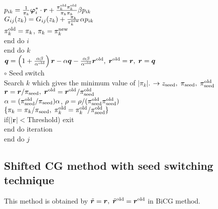 \documentclass[12pt,titlepage]{article}
\begin{document}
\\\hspace{2.0cm}
$p_{i k} = \frac{1}{\pi_k} {\boldsymbol \varphi}_i^* \cdot {\boldsymbol r} + 
\frac{\pi^{\rm old}_k \pi^{\rm old}_k}{\pi_k \pi_k} \beta p_{i k}$
\\\hspace{2.0cm}
$G_{i j}(z_k) = G_{i j}(z_k) + \frac{\pi_k}{\pi_k^{\rm new}} \alpha p_{i k}$
\\\hspace{2.0cm}
$\pi_k^{\rm old} = \pi_k$, $\pi_k = \pi_k^{\rm new}$
\\\hspace{1.5cm}
end do $i$
\\\hspace{1.0cm}
end do $k$
\\\hspace{1.0cm}
${\boldsymbol q} = \left( 1 + \frac{\alpha \beta}{\alpha^{\rm old}} \right) {\boldsymbol r}
- \alpha {\boldsymbol q} - \frac{\alpha \beta}{\alpha^{\rm old}} {\boldsymbol r}^{\rm old},\; 
{\boldsymbol r}^{\rm old} = {\boldsymbol r},\; {\boldsymbol r} = {\boldsymbol q}$
\\\hspace{1.0cm}
$\circ$ Seed switch
\\\hspace{1.0cm}
Search $k$ which gives the minimum value of $|\pi_k|$.
$\rightarrow z_{\rm seed},\; \pi_{\rm seed},\; \pi_{\rm seed}^{\rm old} $
\\\hspace{1.0cm}
${\boldsymbol r} = {\boldsymbol r} / \pi_{\rm seed},\; 
{\boldsymbol r}^{\rm old} = {\boldsymbol r}^{\rm old} / \pi_{\rm seed}^{\rm old}$
\\\hspace{1.0cm}
$\alpha = (\pi_{\rm seed}^{\rm old} / \pi_{\rm seed}) \alpha$,
$\rho = \rho / (\pi_{\rm seed}^{\rm old} \pi_{\rm seed}^{\rm old})$
\\\hspace{1.0cm}
$\{\pi_k = \pi_k/\pi_{\rm seed},\; \pi_k^{\rm old} = \pi_k^{\rm old} / \pi_{\rm seed}^{\rm old}\}$
\\\hspace{1.0cm}
if($|{\boldsymbol r}| < $Threshold) exit
\\\hspace{0.5cm}
end do iteration
\\
end do $j$

\subsection{Shifted CG method with seed switching technique}
This method is obtained by 
${\tilde {\boldsymbol r}} = {\boldsymbol r},\; 
{\tilde {\boldsymbol r}}^{\rm old} = {\boldsymbol r}^{\rm old}$
in BiCG method.
\end{document}
